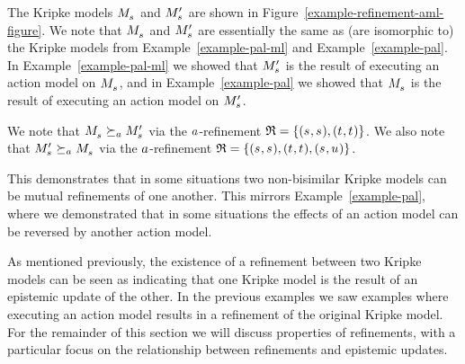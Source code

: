 \begin{example}
\begin{figure}
\end{figure}

The Kripke models $\kPModel{\kStateS}$ and $\kPModelP{\kStateS}$ are shown in Figure~\ref{example-refinement-aml-figure}.
We note that $\kPModel{\kStateS}$ and $\kPModelP{\kStateS}$ are essentially the same as (are isomorphic to) the Kripke models from Example~\ref{example-pal-ml} and Example~\ref{example-pal}.
In Example~\ref{example-pal-ml} we showed that $\kPModelP{\kStateS}$ is the result of executing an action model on $\kPModel{\kStateS}$, and in Example~\ref{example-pal} we showed that $\kPModel{\kStateS}$ is the result of executing an action model on $\kPModelP{\kStateS}$.

We note that $\kPModel{\kStateS} \simulatesA \kPModelP{\kStateS}$ via the $a$-refinement $\refinement = \{(\kStateS, \kStateS), (\kStateT, \kStateT)\}$.
We also note that $\kPModelP{\kStateS} \simulatesA \kPModel{\kStateS}$ via the $a$-refinement $\refinement = \{(\kStateS, \kStateS), (\kStateT, \kStateT), (\kStateS, \kStateU)\}$.

This demonstrates that in some situations two non-bisimilar Kripke models can be mutual refinements of one another.
This mirrors Example~\ref{example-pal}, where we demonstrated that in some situations the effects of an action model can be reversed by another action model. 
\end{example}

\pagebreak

As mentioned previously, the existence of a refinement between two Kripke models can be seen as indicating that one Kripke model is the result of an epistemic update of the other.
In the previous examples we saw examples where executing an action model results in a refinement of the original Kripke model.
For the remainder of this section we will discuss properties of refinements, with a particular focus on the relationship between refinements and epistemic updates.


